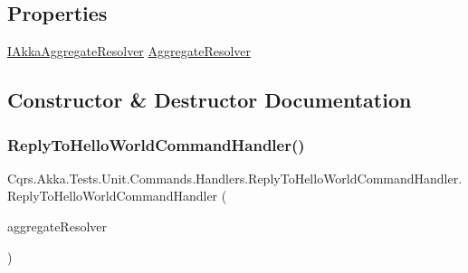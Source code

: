 \subsection*{Properties}
\begin{DoxyCompactItemize}
\item 
\hyperlink{interfaceCqrs_1_1Akka_1_1Domain_1_1IAkkaAggregateResolver}{I\+Akka\+Aggregate\+Resolver} \hyperlink{classCqrs_1_1Akka_1_1Tests_1_1Unit_1_1Commands_1_1Handlers_1_1ReplyToHelloWorldCommandHandler_a2c8f8e4cdceffd4a586f6f7a00962ca6}{Aggregate\+Resolver}
\end{DoxyCompactItemize}


\subsection{Constructor \& Destructor Documentation}
\mbox{\label{classCqrs_1_1Akka_1_1Tests_1_1Unit_1_1Commands_1_1Handlers_1_1ReplyToHelloWorldCommandHandler_ac3c6ef2299fded8533f7e013e6cf763d}} 
\subsubsection{\texorpdfstring{Reply\+To\+Hello\+World\+Command\+Handler()}{ReplyToHelloWorldCommandHandler()}}
{\footnotesize\ttfamily Cqrs.\+Akka.\+Tests.\+Unit.\+Commands.\+Handlers.\+Reply\+To\+Hello\+World\+Command\+Handler.\+Reply\+To\+Hello\+World\+Command\+Handler (\begin{DoxyParamCaption}\item[{\hyperlink{interfaceCqrs_1_1Akka_1_1Domain_1_1IAkkaAggregateResolver}{I\+Akka\+Aggregate\+Resolver}}]{aggregate\+Resolver }\end{DoxyParamCaption})}



